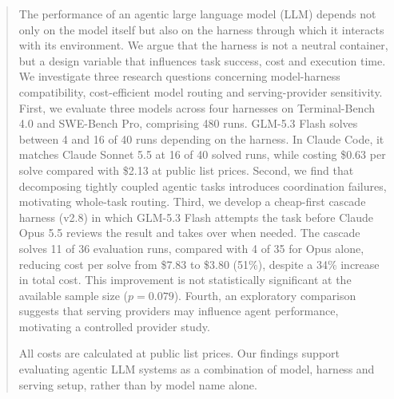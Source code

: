 \begin{abstract}
The performance of an agentic large language model (LLM)
depends not only on the model itself but also on the harness
through which it interacts with its environment. We argue
that the harness is not a neutral container, but a design
variable that influences task success, cost and execution
time. We investigate three research questions concerning
model-harness compatibility, cost-efficient model routing
and serving-provider sensitivity.
First, we evaluate three models across four harnesses on
Terminal-Bench 4.0 and SWE-Bench Pro, comprising 480 runs.
GLM-5.3 Flash solves between 4 and 16 of 40 runs depending
on the harness. In Claude Code, it matches Claude Sonnet
5.5 at 16 of 40 solved runs, while costing \$0.63 per
solve compared with \$2.13 at public list prices. Second, we find that
decomposing tightly coupled agentic tasks introduces
coordination failures, motivating whole-task routing.
Third, we develop a cheap-first cascade harness (v2.8)
in which GLM-5.3 Flash attempts the task before Claude
Opus 5.5 reviews the result and takes over when needed.
The cascade solves 11 of 36 evaluation runs, compared
with 4 of 35 for Opus alone, reducing cost per solve
from \$7.83 to \$3.80 (51\%), despite a 34\% increase
in total cost. This improvement is not statistically
significant at the available sample size ($p = 0.079$).
Fourth, an exploratory comparison suggests that serving
providers may influence agent performance, motivating
a controlled provider study.

All costs are calculated at public list prices.
Our findings support evaluating agentic LLM systems
as a combination of model, harness and serving setup,
rather than by model name alone.
\end{abstract}

